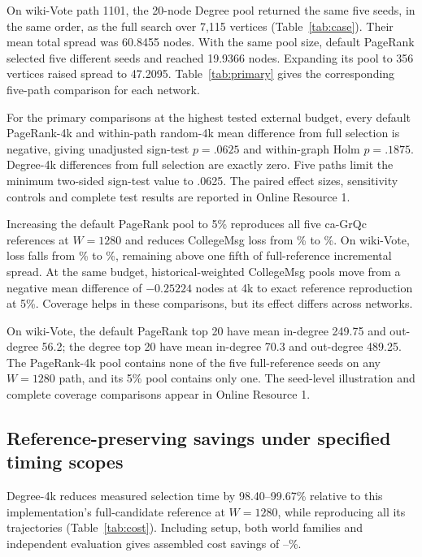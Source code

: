 \documentclass[smallextended]{svjour3}
\begin{document}
On wiki-Vote path 1101, the 20-node Degree pool returned the same five seeds, in the same order, as the full search over 7,115 vertices (Table~\ref{tab:case}). Their mean total spread was 60.8455 nodes. With the same pool size, default PageRank selected five different seeds and reached 19.9366 nodes. Expanding its pool to 356 vertices raised spread to 47.2095. Table~\ref{tab:primary} gives the corresponding five-path comparison for each network.


For the primary comparisons at the highest tested external budget, every default PageRank-4k and within-path random-4k mean difference from full selection is negative, giving unadjusted sign-test $p=.0625$ and within-graph Holm $p=.1875$. Degree-4k differences from full selection are exactly zero. Five paths limit the minimum two-sided sign-test value to .0625. The paired effect sizes, sensitivity controls and complete test results are reported in Online Resource 1.

Increasing the default PageRank pool to 5\% reproduces all five ca-GrQc references at $W=1280$ and reduces CollegeMsg loss from \CollegePRLoss{}\% to \CollegePRfiveLoss{}\%. On wiki-Vote, loss falls from \WikiPRLoss{}\% to \WikiPRfiveLoss{}\%, remaining above one fifth of full-reference incremental spread. At the same budget, historical-weighted CollegeMsg pools move from a negative mean difference of $-0.25224$ nodes at 4k to exact reference reproduction at 5\%. Coverage helps in these comparisons, but its effect differs across networks.

On wiki-Vote, the default PageRank top 20 have mean in-degree 249.75 and out-degree 56.2; the degree top 20 have mean in-degree 70.3 and out-degree 489.25. The PageRank-4k pool contains none of the five full-reference seeds on any $W=1280$ path, and its 5\% pool contains only one. The seed-level illustration and complete coverage comparisons appear in Online Resource 1.

\subsection{Reference-preserving savings under specified timing scopes}
Degree-4k reduces measured selection time by 98.40--99.67\% relative to this implementation's full-candidate reference at $W=1280$, while reproducing all its trajectories (Table~\ref{tab:cost}). Including setup, both world families and independent evaluation gives assembled cost savings of \CollegeDegreeSaving{}--\WikiDegreeSaving{}\%.

\end{document}
